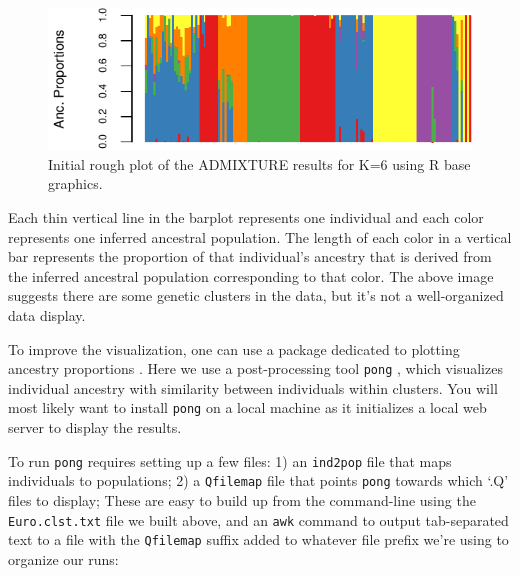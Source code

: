 \documentclass{svmult}       %
\newenvironment{Shaded}{\begin{snugshade}}{\end{snugshade}}
\newcommand{\StringTok}[1]{\textcolor[rgb]{0.31,0.60,0.02}{#1}}
\newcommand{\FunctionTok}[1]{\textcolor[rgb]{0.00,0.00,0.00}{#1}}
\newcommand{\VariableTok}[1]{\textcolor[rgb]{0.00,0.00,0.00}{#1}}
\newcommand{\OperatorTok}[1]{\textcolor[rgb]{0.81,0.36,0.00}{\textbf{#1}}}
\newcommand{\NormalTok}[1]{#1}
\begin{document}
\begin{figure}
\centering
\includegraphics{Figures/Figure1.pdf}
\caption{\label{fig:Fig1}
    Initial rough plot of the ADMIXTURE results for K=6 using R base graphics.}
\end{figure}

Each thin vertical line in the barplot represents one individual and
each color represents one inferred ancestral population. The length of
each color in a vertical bar represents the proportion of that
individual's ancestry that is derived from the inferred ancestral
population corresponding to that color. The above image suggests there
are some genetic clusters in the data, but it's not a well-organized
data display.

To improve the visualization, one can use a package dedicated to
plotting ancestry proportions \cite{Rosenberg04,Kopelman15,Behr16}. Here we use a post-processing tool
\texttt{pong} \cite{Behr16}, which visualizes individual ancestry
with similarity between individuals within clusters. You will most
likely want to install \texttt{pong} on a local machine as it
initializes a local web server to display the results.

To run \texttt{pong} requires setting up a few files: 1) an
\texttt{ind2pop} file that maps individuals to populations; 2) a
\texttt{Qfilemap} file that points \texttt{pong} towards which `.Q'
files to display; These are easy to build up from the command-line using
the \texttt{Euro.clst.txt} file we built above, and an \texttt{awk}
command to output tab-separated text to a file with the
\texttt{Qfilemap} suffix added to whatever file prefix we're using to
organize our runs:

\begin{Shaded}
\end{Shaded}
\end{document}
